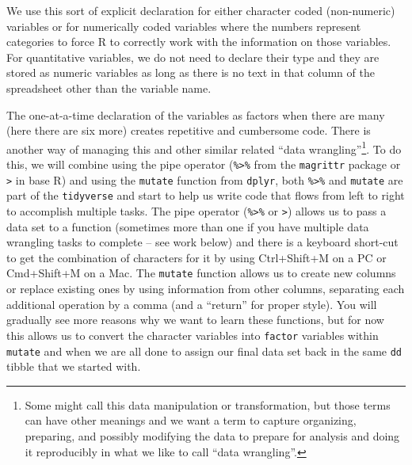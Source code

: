 \documentclass[
]{book}
\newenvironment{Shaded}{\begin{snugshade}}{\end{snugshade}}
\newcommand{\FunctionTok}[1]{\textcolor[rgb]{0.00,0.00,0.00}{#1}}
\newcommand{\NormalTok}[1]{#1}
\newcommand{\OtherTok}[1]{\textcolor[rgb]{0.56,0.35,0.01}{#1}}
\newcommand{\SpecialCharTok}[1]{\textcolor[rgb]{0.00,0.00,0.00}{#1}}
\begin{document}
\begin{Shaded}
\end{Shaded}

We use this sort of explicit declaration for either character coded (non-numeric) variables or for numerically coded variables where the numbers represent categories to force R to correctly work with the information on those variables. For quantitative variables, we do not need to declare their type and they are stored as numeric variables as long as there is no text in that column of the spreadsheet other than the variable name.

\indent The one-at-a-time declaration of the variables as factors when there are many (here there are six more) creates repetitive and cumbersome code. There is another way of managing this and other similar related ``data wrangling''\footnote{Some might call this data manipulation or transformation, but those terms can have other meanings and we want a term to capture organizing, preparing, and possibly modifying the data to prepare for analysis and doing it reproducibly in what we like to call ``data wrangling''.}. To do this, we will combine using the pipe operator (\texttt{\%\textgreater{}\%} from the \texttt{magrittr} package or \texttt{\textbar{}\textgreater{}} in base R) and using the \texttt{mutate} function from \texttt{dplyr}, both \texttt{\%\textgreater{}\%} and \texttt{mutate} are part of the \texttt{tidyverse} and start to help us write code that flows from left to right to accomplish multiple tasks.  \index{\texttt{\%>\%}}    The pipe operator (\texttt{\%\textgreater{}\%} or \texttt{\textbar{}\textgreater{}}) allows us to pass a data set to a function (sometimes more than one if you have multiple data wrangling tasks to complete -- see work below) and there is a keyboard short-cut to get the combination of characters for it by using Ctrl+Shift+M on a PC or Cmd+Shift+M on a Mac. The \texttt{mutate} function allows us to create new columns or replace existing ones by using information from other columns, separating each additional operation by a comma (and a ``return'' for proper style). You will gradually see more reasons why we want to learn these functions, but for now this allows us to convert the character variables into \texttt{factor} variables within \texttt{mutate} and when we are all done to assign our final data set back in the same \texttt{dd} tibble that we started with.
\end{document}
